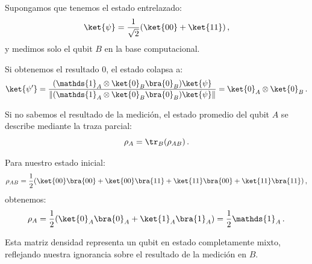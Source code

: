 \begin{eje}
  Supongamos que tenemos el estado entrelazado:
  \[
    \ket{\psi} = \frac{1}{\sqrt{2}}(\ket{00} + \ket{11})\,,
  \]
  y medimos solo el qubit $B$ en la base computacional.

  Si obtenemos el resultado $0$, el estado colapsa a:
  \[
    \ket{\psi'} = \frac{(\mathds{1}_A \otimes \ket{0}_B\bra{0}_B)\ket{\psi}}{\|(\mathds{1}_A \otimes \ket{0}_B\bra{0}_B)\ket{\psi}\|} = \ket{0}_A \otimes \ket{0}_B\,.
  \]

  Si no sabemos el resultado de la medición, el estado promedio del qubit $A$ se describe mediante la traza parcial:
  \[
    \rho_A = \tr_B(\rho_{AB})\,.
  \]

  Para nuestro estado inicial:
  \[
    \rho_{AB} = \frac{1}{2}(\ket{00}\bra{00} + \ket{00}\bra{11} + \ket{11}\bra{00} + \ket{11}\bra{11})\,,
  \]
  obtenemos:
  \[
    \rho_A = \frac{1}{2}(\ket{0}_A\bra{0}_A + \ket{1}_A\bra{1}_A) = \frac{1}{2}\mathds{1}_A\,.
  \]

  Esta matriz densidad representa un qubit en estado completamente mixto, reflejando nuestra ignorancia sobre el resultado de la medición en $B$.
\end{eje}

